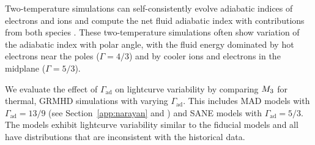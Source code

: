 Two-temperature simulations can self-consistently evolve adiabatic indices of electrons and ions and compute the net fluid adiabatic index with contributions from both species \citep{10.1093/mnras/stw3116}.
These two-temperature simulations often show variation of the adiabatic index with polar angle, with the fluid energy dominated by hot electrons near the poles ($\Gamma = 4/3$) and by cooler ions and  electrons in the midplane ($\Gamma=5/3$).

We evaluate the effect of $\Gamma_\mathrm{ad}$ on lightcurve variability by comparing $M_{3}$ for thermal, GRMHD simulations with varying  $\Gamma_\mathrm{ad}$.
This includes MAD models with $\Gamma_\mathrm{ad}=13/9$ (see Section~\ref{app:narayan} and  \citealt{2021arXiv210812380N}) and SANE models with $\Gamma_\mathrm{ad}=5/3$.
The models exhibit lightcurve variability similar to the fiducial models and all have  distributions that are inconsistent with the historical data.
